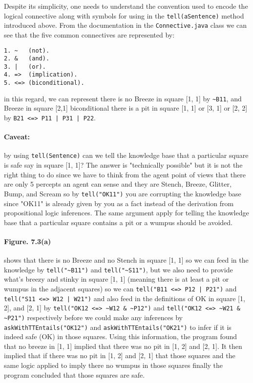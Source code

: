 \documentclass[a4paper]{report}
\begin{document}
Despite its simplicity, one needs to understand the convention used to encode the logical connective along with symbols for using in the \texttt{tell(aSentence)} method introduced above. From the documentation in the \texttt{Connective.java} class we can see that the five common connectives are represented by: 

\begin{verbatim}
1. ~   (not).
2. &   (and).
3. |   (or).
4. =>  (implication).
5. <=> (biconditional).
\end{verbatim}

\noindent in this regard, we can represent there is no Breeze in square [1, 1] by \texttt{\textasciitilde{}B11}, and Breeze in square [2,1] biconditional there is a pit in square [1, 1] or [3, 1] or [2, 2] by \texttt{B21 <=> P11 | P31 | P22}.

\paragraph{Caveat: } by using \texttt{tell(Sentence)} can we tell the knowledge base that a particular square is safe say in square [1, 1]? The answer is "technically possible" but it is not the right thing to do since we have to think from the agent point of views that there are only 5 percepts an agent can sense and they are Stench, Breeze, Glitter, Bump, and Scream so by \texttt{tell("OK11")} you are corrupting the knowledge base since "OK11" is already given by you as a fact instead of the derivation from propositional logic inferences. The same argument apply for telling the knowledge base that a particular square contains a pit or a wumpus should be avoided.\\

\paragraph{Figure. 7.3(a) } shows that there is no Breeze and no Stench in square [1, 1] so we can feed in the knowledge by \texttt{tell("\textasciitilde{}B11")} and \texttt{tell("\textasciitilde{}S11")}, but we also need to provide what's breezy and stinky in square [1, 1] (meaning there is at least a pit or wumpus in the adjacent squares) so we can \texttt{tell("B11 <=> P12 | P21")} and \texttt{tell("S11 <=> W12 | W21")} and also feed in the definitions of OK in square [1, 2], and [2, 1] by \texttt{tell("OK12 <=> \textasciitilde{}W12 \& \textasciitilde{}P12")} and \texttt{tell("OK12 <=> \textasciitilde{}W21 \& \textasciitilde{}P21")} respectively before we could make any inferences by \texttt{askWithTTEntails("OK12")} and \texttt{askWithTTEntails("OK21")} to infer if it is indeed safe (OK) in those squares. Using this information, the program found that no breeze in [1, 1] implied that there was no pit in [1, 2] and [2, 1]. It then implied that if there was no pit in [1, 2] and [2, 1] that those squares and the same logic applied to imply there no wumpus in those squares finally the program concluded that those squares are safe. \\
\end{document}
